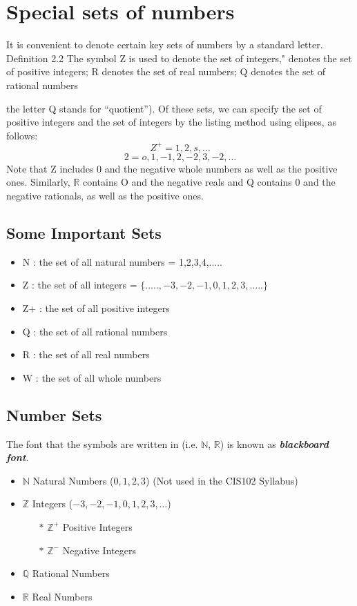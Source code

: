 \documentclass[11pt,a4paper,titlepage,oneside,openany]{article}
\numberwithin{equation}{section}
\numberwithin{algorithm}{section}
\numberwithin{figure}{section}
\numberwithin{table}{section}
\begin{document}
\section{Special sets of numbers}
\smallskip 
It is convenient to denote certain key sets of numbers by a standard letter.
Definition 2.2 
The symbol Z is used to denote the set of integers," 
 denotes the set of positive integers; 
 R denotes the set of real numbers;
Q denotes the set of rational numbers {the letter Q stands for “quotient”).
\smallskip 
\smallskip 
Of these sets, we can specify the set of positive integers and the set of integers by the listing method
using elipses, as follows:
\[Z^{+} = {1,2,s,...}\]
\[2 = {o,1,-1,2,-2,3,-2,...}\]
Note that Z includes 0 and the negative whole numbers as well as the positive ones. Similarly,
$\mathbb{R}$ contains O and the negative reals and Q contains 0 and the negative rationals, as well as the
positive ones.

\subsection{Some Important Sets}
\begin{itemize}
\item N : the set of all natural numbers = {1,2,3,4,.....}
\item Z : the set of all integers = $\{.....,-3,-2,-1,0,1,2,3,.....\}$
\item Z+ : the set of all positive integers
\item Q : the set of all rational numbers
\item R : the set of all real numbers
\item W : the set of all whole numbers
\end{itemize}


\subsection{Number Sets}
The font that the symbols are written in (i.e. $\mathbb{N}$, $\mathbb{R}$) is known as \textit{\textbf{blackboard font}}.
\begin{itemize}
\item $\mathbb{N}$ Natural Numbers ($0,1,2,3$) 
(Not used in the CIS102 Syllabus)
\item $\mathbb{Z}$ Integers ($-3,-2,-1,0,1,2,3, \ldots$)
\begin{itemize}
\item[$\ast$] $\mathbb{Z}^{+}$ Positive Integers
\item[$\ast$] $\mathbb{Z}^{-}$ Negative Integers
\end{itemize}
\item $\mathbb{Q}$ Rational Numbers
\item $\mathbb{R}$ Real Numbers
\end{itemize}

}
\end{document}
